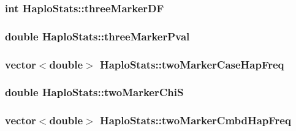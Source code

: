 \label{classHaploStats_aeabf9d28af93060be4d3b7a06a36684c}
\hypertarget{classHaploStats_a88b45a1784a3af46f1727325f1520300}{
\subsubsection[{threeMarkerDF}]{\setlength{\rightskip}{0pt plus 5cm}int {\bf HaploStats::threeMarkerDF}}}
\label{classHaploStats_a88b45a1784a3af46f1727325f1520300}
\hypertarget{classHaploStats_aaaff3d8ec32e831c25296fca296b3f25}{
\subsubsection[{threeMarkerPval}]{\setlength{\rightskip}{0pt plus 5cm}double {\bf HaploStats::threeMarkerPval}}}
\label{classHaploStats_aaaff3d8ec32e831c25296fca296b3f25}
\hypertarget{classHaploStats_ac65cb68586d5102e6b771b5d2cca24eb}{
\subsubsection[{twoMarkerCaseHapFreq}]{\setlength{\rightskip}{0pt plus 5cm}vector$<$double$>$ {\bf HaploStats::twoMarkerCaseHapFreq}}}
\label{classHaploStats_ac65cb68586d5102e6b771b5d2cca24eb}
\hypertarget{classHaploStats_ae09deb6ca71b310c0c8362b0c92bd116}{
\subsubsection[{twoMarkerChiS}]{\setlength{\rightskip}{0pt plus 5cm}double {\bf HaploStats::twoMarkerChiS}}}
\label{classHaploStats_ae09deb6ca71b310c0c8362b0c92bd116}
\hypertarget{classHaploStats_a0a4928ebe077029a82a13fcdb10910c7}{
\subsubsection[{twoMarkerCmbdHapFreq}]{\setlength{\rightskip}{0pt plus 5cm}vector$<$double$>$ {\bf HaploStats::twoMarkerCmbdHapFreq}}}
